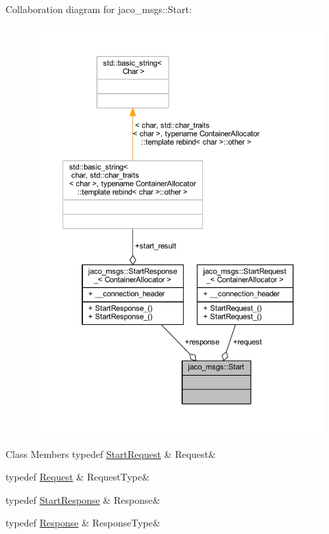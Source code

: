 Collaboration diagram for jaco\+\_\+msgs\+:\+:Start\+:
\nopagebreak
\begin{figure}[H]
\begin{center}
\leavevmode
\includegraphics[width=350pt]{d4/d8c/structjaco__msgs_1_1Start__coll__graph}
\end{center}
\end{figure}
\begin{DoxyFields}{Class Members}
typedef \hyperlink{namespacejaco__msgs_a967d4b8e4c7fe72a2b13622d4ac5b317}{Start\+Request}\hypertarget{namespacejaco__msgs_a90e69ae86033a05c547300c6c7759df5}{}\label{namespacejaco__msgs_a90e69ae86033a05c547300c6c7759df5}
&
Request&
\\
\hline

typedef \hyperlink{namespacejaco__msgs_a90e69ae86033a05c547300c6c7759df5}{Request}\hypertarget{namespacejaco__msgs_a13cd04516698a4c21cb06a25a901b6a9}{}\label{namespacejaco__msgs_a13cd04516698a4c21cb06a25a901b6a9}
&
Request\+Type&
\\
\hline

typedef \hyperlink{namespacejaco__msgs_ab90a2d56175265d26907e49c8a56088d}{Start\+Response}\hypertarget{namespacejaco__msgs_a6efcf3689af0dcd0ac318ef8ffdc1f79}{}\label{namespacejaco__msgs_a6efcf3689af0dcd0ac318ef8ffdc1f79}
&
Response&
\\
\hline

typedef \hyperlink{namespacejaco__msgs_a6efcf3689af0dcd0ac318ef8ffdc1f79}{Response}\hypertarget{namespacejaco__msgs_adaa816633c4bcf28330d7efc12bd4ad9}{}\label{namespacejaco__msgs_adaa816633c4bcf28330d7efc12bd4ad9}
&
Response\+Type&
\\
\hline

\end{DoxyFields}
